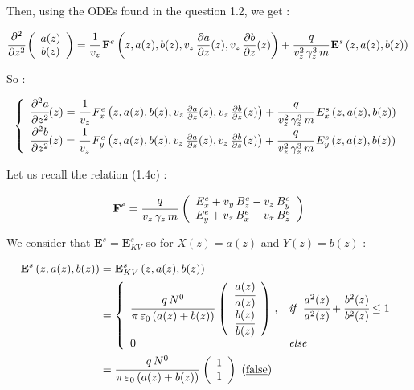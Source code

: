 \documentclass[10pt]{article}
\newcommand{\D}{{\partial}}
\begin{document}
Then, using the ODEs found in the question 1.2, we get :

$$\cfrac{\D^2}{\D z^2}\left( \begin{array}{c} a(z) \\ b(z) \end{array}\right) = \cfrac{1}{v_{z}}\,\mathbf{F}^e \left(z,a(z),b(z),v_z\,\frac{\D a}{\D z}(z),v_z\,\frac{\D b}{\D z}(z)\right) + \cfrac{q}{v_{z}^2\,\gamma_{z}^{3}\,m}\, \mathbf{E}^s\left(z,a(z),b(z)\right) \\
$$

So :

$$
\left\lbrace
    \begin{array}{ll}
\cfrac{\D^2 a}{\D z^2}(z) = \cfrac{1}{v_{z}}\,F^e_x \left(z,a(z),b(z),v_z\,\frac{\D a}{\D z}(z),v_z\,\frac{\D b}{\D z}(z)\right) + \cfrac{q}{v_{z}^2\,\gamma_{z}^{3}\,m}\, E^s_x\left(z,a(z),b(z)\right) \\
\cfrac{\D^2 b}{\D z^2}(z) = \cfrac{1}{v_{z}}\,F^e_y \left(z,a(z),b(z),v_z\,\frac{\D a}{\D z}(z),v_z\,\frac{\D b}{\D z}(z)\right) + \cfrac{q}{v_{z}^2\,\gamma_{z}^{3}\,m}\, E^s_y\left(z,a(z),b(z)\right)
    \end{array}
\right.
$$

Let us recall the relation (1.4c) :

$$
\mathbf{F}^{e} = \cfrac{q}{v_{z}\,\gamma_{z}\,m}\, \left(
\begin{array}{c}
E_{x}^{e} + v_{y}\,B_{z}^{e} - v_{z}\,B_{y}^{e} \\
E_{y}^{e} + v_{z}\,B_{x}^{e} - v_{x}\,B_{z}^{e}
\end{array}
\right)
$$

We consider that $\mathbf{E}^s = \mathbf{E}^s_{KV}$ so for $X(z) = a(z)$ and $Y(z) = b(z)$ :

\begin{align*}
\mathbf{E}^s\left(z,a(z),b(z)\right) 
&= \mathbf{E}^s_{KV}\left(z,a(z),b(z)\right) \\ 
&= 
\left\{
\begin{array}{ll}
\cfrac{q\,N^{0}}{\pi\,\varepsilon_{0}\,(a(z)+b(z))}\, \left(
\begin{array}{c}
\cfrac{a(z)}{a(z)} \\ \cfrac{b(z)}{b(z)}
\end{array}
\right) \, , & \textit{if } \; \cfrac{a^{2}(z)}{a^{2}(z)} + \cfrac{b^{2}(z)}{b^{2}(z)} \leq 1 \\
0 & \textit{else}
\end{array}
\right. \\
&= \cfrac{q\,N^{0}}{\pi\,\varepsilon_{0}\,(a(z)+b(z))}\, \left(
\begin{array}{c}
1 \\ 1
\end{array}
\right) \mbox{ (\underline{false}) }
\end{align*}
\end{document}
